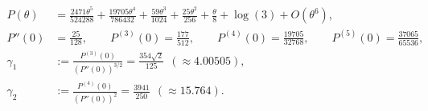 \[
\begin{aligned}
P(\theta)
&=\frac{2471 \theta^{5}}{524288} + \frac{19705 \theta^{4}}{786432} + \frac{59 \theta^{3}}{1024} + \frac{25 \theta^{2}}{256} + \frac{\theta}{8} + \log{\left(3 \right)}+O(\theta^{6}),\\
P''(0)&=\frac{25}{128},\qquad P^{(3)}(0)=\frac{177}{512},\qquad P^{(4)}(0)=\frac{19705}{32768},\qquad P^{(5)}(0)=\frac{37065}{65536},\\
\gamma_1&:=\frac{P^{(3)}(0)}{(P''(0))^{3/2}}=\frac{354 \sqrt{2}}{125}\ \ (\approx 4.00505),\\
\gamma_2&:=\frac{P^{(4)}(0)}{(P''(0))^2}=\frac{3941}{250}\ \ (\approx 15.764).
\end{aligned}
\]
